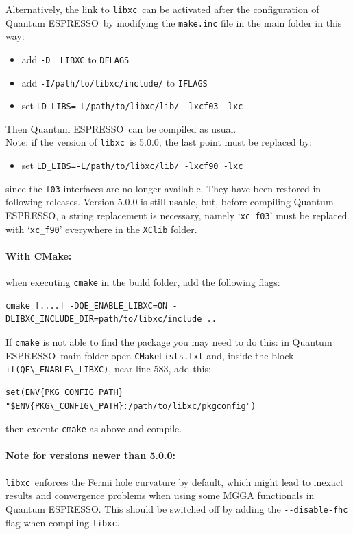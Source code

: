 \documentclass[12pt,a4paper]{article}
\def\qe{{\sc Quantum ESPRESSO}}
\def\libxc{\texttt{libxc}}
\begin{document}
Alternatively, the link to \libxc\ can be activated after the configuration of  \qe\ by modifying the \texttt{make.inc} file in the main folder in this way:
\begin{itemize}
	\item add \texttt{-D\_\_LIBXC} to \texttt{DFLAGS}
	\item add \texttt{-I/path/to/libxc/include/} to \texttt{IFLAGS}
	\item set \texttt{LD\_LIBS=-L/path/to/libxc/lib/ -lxcf03 -lxc}
\end{itemize}
Then \qe\ can be compiled as usual.\\
Note: if the version of \libxc\ is 5.0.0, the last point must be replaced by:
\begin{itemize}
	\item set \texttt{LD\_LIBS=-L/path/to/libxc/lib/ -lxcf90 -lxc}
\end{itemize}
since the \texttt{f03} interfaces are no longer available. They have been restored in following releases. Version 5.0.0 is still usable, but, before compiling \qe, a string replacement is necessary, namely `\texttt{xc\_f03}' must be replaced with `\texttt{xc\_f90}' everywhere in the \texttt{XClib} folder.

\paragraph{With CMake:} when executing \verb|cmake| in the build folder, add the following flags:
\begin{verbatim}
cmake [....] -DQE_ENABLE_LIBXC=ON -DLIBXC_INCLUDE_DIR=path/to/libxc/include ..
\end{verbatim}
If \verb|cmake| is not able to find the package you may need to do this: in \qe\ main folder open \texttt{CMakeLists.txt} and, inside the block \verb|if(QE\_ENABLE\_LIBXC)|, near line 583,  add this:
\begin{verbatim}
set(ENV{PKG_CONFIG_PATH} "$ENV{PKG\_CONFIG\_PATH}:/path/to/libxc/pkgconfig")
\end{verbatim}
then execute \verb|cmake| as above and compile.

\paragraph{Note for versions newer than 5.0.0:} \libxc\ enforces the Fermi hole curvature by default, which might lead to inexact results and convergence problems when using some MGGA functionals in \qe. This should be switched off by adding the \verb|--disable-fhc| flag when compiling \libxc.
\end{document}
